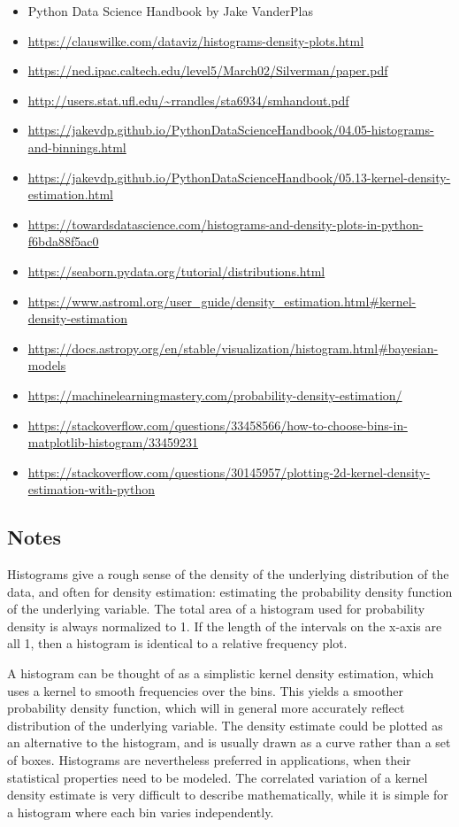 \begin{itemize}
    \item Python Data Science Handbook by Jake VanderPlas
    \item \url{https://clauswilke.com/dataviz/histograms-density-plots.html}
    \item \url{https://ned.ipac.caltech.edu/level5/March02/Silverman/paper.pdf}
    \item \url{http://users.stat.ufl.edu/~rrandles/sta6934/smhandout.pdf}
    \item \url{https://jakevdp.github.io/PythonDataScienceHandbook/04.05-histograms-and-binnings.html}
    \item \url{https://jakevdp.github.io/PythonDataScienceHandbook/05.13-kernel-density-estimation.html}
    \item \url{https://towardsdatascience.com/histograms-and-density-plots-in-python-f6bda88f5ac0}
    \item \url{https://seaborn.pydata.org/tutorial/distributions.html}
    \item \url{https://www.astroml.org/user_guide/density_estimation.html#kernel-density-estimation}
    \item \url{https://docs.astropy.org/en/stable/visualization/histogram.html#bayesian-models}
    \item \url{https://machinelearningmastery.com/probability-density-estimation/}
    \item \url{https://stackoverflow.com/questions/33458566/how-to-choose-bins-in-matplotlib-histogram/33459231}
    \item \url{https://stackoverflow.com/questions/30145957/plotting-2d-kernel-density-estimation-with-python}
\end{itemize}



\subsection{Notes}

Histograms give a rough sense of the density of the underlying distribution of the data, and often for density estimation: estimating the probability density function of the underlying variable. The total area of a histogram used for probability density is always normalized to 1. If the length of the intervals on the x-axis are all 1, then a histogram is identical to a relative frequency plot.

A histogram can be thought of as a simplistic kernel density estimation, which uses a kernel to smooth frequencies over the bins. This yields a smoother probability density function, which will in general more accurately reflect distribution of the underlying variable. The density estimate could be plotted as an alternative to the histogram, and is usually drawn as a curve rather than a set of boxes. Histograms are nevertheless preferred in applications, when their statistical properties need to be modeled. The correlated variation of a kernel density estimate is very difficult to describe mathematically, while it is simple for a histogram where each bin varies independently. 


